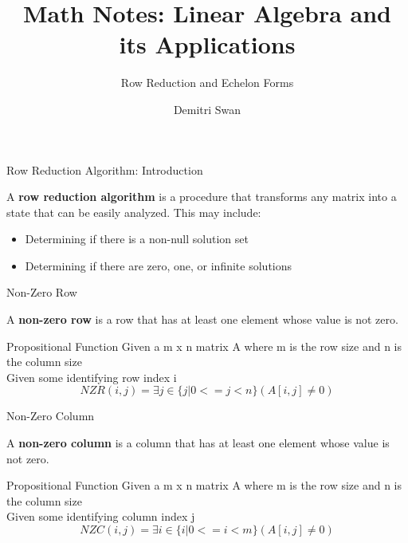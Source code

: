 \documentclass{beamer}
\title{Math Notes: Linear Algebra and its Applications}
\subtitle[short subtitle]{Row Reduction and Echelon Forms}
\author{Demitri Swan}
\date{}
\begin{document}
\begin{frame}
  \titlepage %
\end{frame}

\begin{frame}{Row Reduction Algorithm: Introduction}
\begin{definition}
A \textbf{row reduction algorithm} is a procedure that transforms any matrix into a state
that can be easily analyzed. This may include:
\begin{itemize}
\item Determining if there is a non-null solution set
\item Determining if there are zero, one, or infinite solutions
\end{itemize}
\end{definition}
\end{frame}

\begin{frame}{Non-Zero Row}
\begin{definition}
A \textbf{non-zero row} is a row that has at least one element whose value is not zero. \\
\begin{block}{Propositional Function}
Given a m x n matrix A where m is the row size and n is the column size \\
Given some identifying row index i \\ 
\begin{equation}
NZR(i, j) = \exists j \in \{ j | 0 <= j < n \} \left( A\left[i, j\right] \neq 0 \right)
\end{equation}
\end{block}
\end{definition}
\end{frame}

\begin{frame}{Non-Zero Column}
\begin{definition}
A \textbf{non-zero column} is a column that has at least one element whose value is not zero. \\
\begin{block}{Propositional Function}
Given a m x n matrix A where m is the row size and n is the column size \\
Given some identifying column index j \\ 
\begin{equation}
NZC(i, j) = \exists i \in \{ i | 0 <= i < m \} \left( A\left[i, j\right] \neq 0 \right)
\end{equation}
\end{block}
\end{definition}
\end{frame}
\end{document}
